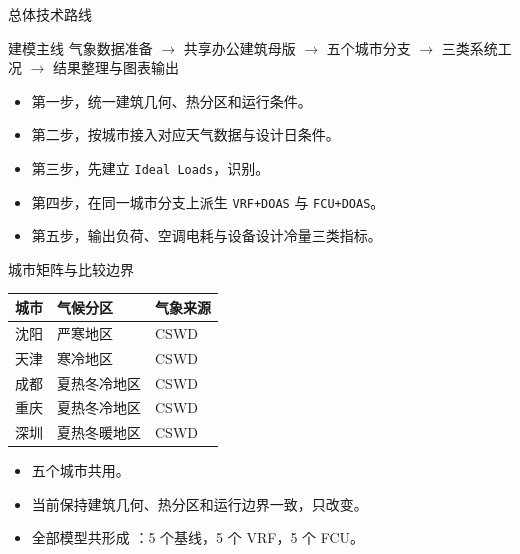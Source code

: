 \documentclass{beamer}
\begin{document}
\begin{frame}{总体技术路线}
\small
\begin{block}{建模主线}
\centering
气象数据准备 $\rightarrow$ 共享办公建筑母版 $\rightarrow$ 五个城市分支 $\rightarrow$ 三类系统工况 $\rightarrow$ 结果整理与图表输出
\end{block}

\vspace{0.5em}
\begin{itemize}
    \item 第一步，统一建筑几何、热分区和运行条件。
    \item 第二步，按城市接入对应天气数据与设计日条件。
    \item 第三步，先建立 \texttt{Ideal Loads}，识别。
    \item 第四步，在同一城市分支上派生 \texttt{VRF+DOAS} 与 \texttt{FCU+DOAS}。
    \item 第五步，输出负荷、空调电耗与设备设计冷量三类指标。
\end{itemize}
\end{frame}

\begin{frame}{城市矩阵与比较边界}
\small
\begin{table}
\centering
\begin{tabular}{>{\raggedright\arraybackslash}p{1.7cm} >{\raggedright\arraybackslash}p{2.8cm} >{\centering\arraybackslash}p{1.7cm}}
\toprule
城市 & 气候分区 & 气象来源 \\
\midrule
沈阳 & 严寒地区 & CSWD \\
天津 & 寒冷地区 & CSWD \\
成都 & 夏热冬冷地区 & CSWD \\
重庆 & 夏热冬冷地区 & CSWD \\
深圳 & 夏热冬暖地区 & CSWD \\
\bottomrule
\end{tabular}
\end{table}

\vspace{0.2em}
\begin{itemize}
    \item 五个城市共用。
    \item 当前保持建筑几何、热分区和运行边界一致，只改变。
    \item 全部模型共形成 ：5 个基线，5 个 VRF，5 个 FCU。
\end{itemize}
\end{frame}
\end{document}
